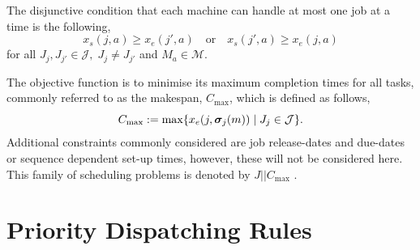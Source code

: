 \documentclass[smallextended]{svjour3}
\begin{document}
The disjunctive condition that each machine can handle at most one job at a 
time is the following,
\begin{equation}\label{eq:oneJobPerMac}
x_s(j,a) \geq x_e(j',a) \quad\textrm{or}\quad x_s(j',a) \geq x_e(j,a)  
\end{equation}
for all $J_j,J_{j'}\in\mathcal{J},\; J_j\neq J_{j'}$ and $M_a\in\mathcal{M}$. 

The objective function is to minimise its maximum completion times for all 
tasks, commonly referred to as the makespan, $C_{\max}$, which is defined as 
follows,
\begin{equation}
C_{\max} := 
\max\{x_e(j,\bm \sigma_j(m))\;|\;J_j\in\mathcal{J}\}.\label{eq:makespan}
\end{equation} 
Additional constraints commonly considered are job release-dates and due-dates 
or sequence dependent set-up times, however, these will not be considered here. 
This family of scheduling problems is denoted by $J||C_{\max}$ 
\cite{Pinedo08}.  



\section{Priority Dispatching Rules} \label{sec:constructionjssp}
\end{document}
